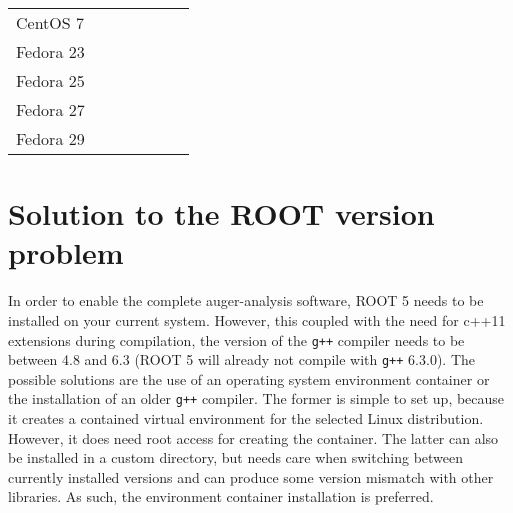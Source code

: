\documentclass[12pt,a4paper]{report}
\begin{document}
\begin{table}[h]
\begin{tabular}{M{0.23\textwidth}M{0.08\textwidth}||M{0.08\textwidth}||M{0.10\textwidth}||M{0.08\textwidth}||M{0.10\textwidth}||M{0.14\textwidth}}
   CentOS 7 &  &  &  &  &  &  \\
   Fedora 23 &  &  &  &  &  &  \\
   Fedora 25 &  &  &  &  & &  \\
   Fedora 27 &  &  &  &  &  &  \\
   Fedora 29 &  &  &  &  &  &  \\
   \bottomrule[1.4pt]
   \end{tabular}
   \label{tab:softwareCheck}
\end{table}

\section{Solution to the ROOT version problem}
In order to enable the complete auger-analysis software, ROOT 5 needs to be installed on your current system. However, this coupled with the need for c++11 extensions during compilation, the version of the \texttt{g++} compiler needs to be between 4.8 and 6.3 (ROOT 5 will already not compile with \texttt{g++} 6.3.0). The possible solutions are the use of an operating system environment container or the installation of an older \texttt{g++} compiler. The former is simple to set up, because it creates a contained virtual environment for the selected Linux distribution. However, it does need root access for creating the container. The latter can also be installed in a custom directory, but needs care when switching between currently installed versions and can produce some version mismatch with other libraries. As such, the environment container installation is preferred.
\end{document}
